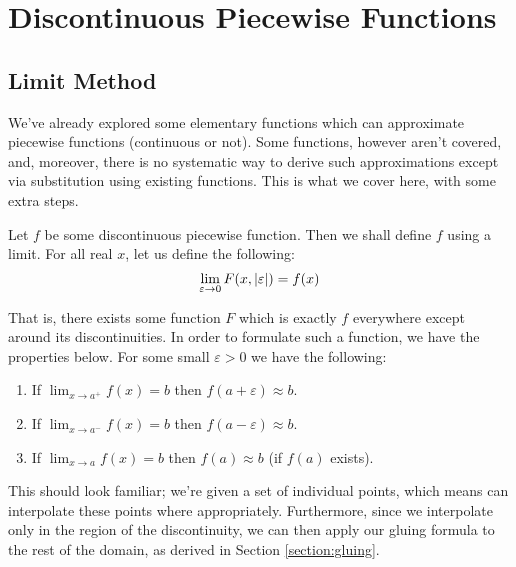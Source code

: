 \chapter{Discontinuous Piecewise Functions}
\section{Limit Method}
We've already explored some elementary functions which can approximate piecewise functions (continuous or not). Some functions, however aren't covered, and, moreover, there is no systematic way to derive such approximations except via substitution using existing functions. This is what we cover here, with some extra steps.

Let $f$ be some discontinuous piecewise function. Then we shall define $f$ using a limit. For all real $x$, let us define the following:
$$
    \lim_{\varepsilon\to0}{F(x,\abs{\varepsilon})}=f(x)
$$

That is, there exists some function $F$ which is exactly $f$ everywhere except around its discontinuities. In order to formulate such a function, we have the properties below. For some small $\varepsilon>0$ we have the following:

\begin{enumerate}
    \item If $\lim_{x\to a^+}{f(x)}=b$ then $f(a+\varepsilon)\approx b$.
    \item If $\lim_{x\to a^-}{f(x)}=b$ then $f(a-\varepsilon)\approx b$.
    \item If $\lim_{x\to a}{f(x)}=b$ then $f(a)\approx b$ (if $f(a)$ exists).
\end{enumerate}

This should look familiar; we're given a set of individual points, which means can interpolate these points where appropriately. Furthermore, since we interpolate only in the region of the discontinuity, we can then apply our gluing formula to the rest of the domain, as derived in Section \ref{section:gluing}.

